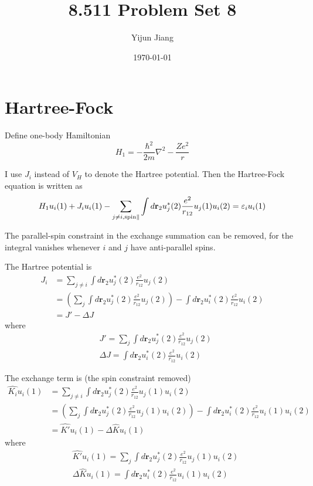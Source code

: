 \documentclass{article}
\title{8.511 Problem Set 8}
\author{Yijun Jiang}
\date{\today}
\begin{document}
\maketitle
\section{Hartree-Fock}
Define one-body Hamiltonian
\begin{equation*}
H_1=-\frac{\hbar^2}{2m}\nabla^2-\frac{Ze^2}{r}
\end{equation*}

I use $J_i$ instead of $V_H$ to denote the Hartree potential. Then the Hartree-Fock equation is written as
\begin{equation*}
H_1u_i(1)+J_iu_i(1)-\sum_{j\neq i,\textup{spin}\parallel}\int d\mathbf{r}_2u_j^*(2)\frac{e^2}{r_{12}}u_j(1)u_i(2)=\varepsilon_iu_i(1)
\end{equation*}

The parallel-spin constraint in the exchange summation can be removed, for the integral vanishes whenever $i$ and $j$ have anti-parallel spins.

The Hartree potential is
\begin{align*}
J_i&=\sum_{j\neq i}\int d\mathbf{r}_2u_j^*(2)\frac{e^2}{r_{12}}u_j(2)\\
&=\left(\sum_j\int d\mathbf{r}_2u_j^*(2)\frac{e^2}{r_{12}}u_j(2)\right)-\int d\mathbf{r}_2u_i^*(2)\frac{e^2}{r_{12}}u_i(2)\\
&=J'-\Delta J
\end{align*}
where
\begin{align*}
&J'=\sum_j\int d\mathbf{r}_2u_j^*(2)\frac{e^2}{r_{12}}u_j(2)\\
&\Delta J=\int d\mathbf{r}_2u_i^*(2)\frac{e^2}{r_{12}}u_i(2)
\end{align*}

The exchange term is (the spin constraint removed)
\begin{align*}
\hat{K_i}u_i(1)&=\sum_{j\neq i}\int d\mathbf{r}_2u_j^*(2)\frac{e^2}{r_{12}}u_j(1)u_i(2)\\
&=\left(\sum_j\int d\mathbf{r}_2u_j^*(2)\frac{e^2}{r_{12}}u_j(1)u_i(2)\right)-\int d\mathbf{r}_2u_i^*(2)\frac{e^2}{r_{12}}u_i(1)u_i(2)\\
&=\hat{K'}u_i(1)-\Delta\hat{K}u_i(1)
\end{align*}
where
\begin{align*}
&\hat{K'}u_i(1)=\sum_j\int d\mathbf{r}_2u_j^*(2)\frac{e^2}{r_{12}}u_j(1)u_i(2)\\
&\Delta\hat{K}u_i(1)=\int d\mathbf{r}_2u_i^*(2)\frac{e^2}{r_{12}}u_i(1)u_i(2)
\end{align*}
\end{document}

